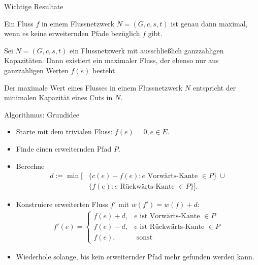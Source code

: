 \documentclass[aspectratio=169]{beamer}
\begin{document}
  \begin{frame}{Wichtige Resultate}

  \begin{theorem*}
    Ein Fluss $f$ in einem Flussnetzwerk $N = (G,c,s,t)$ ist genau dann maximal,
    wenn es keine erweiternden Pfade bezüglich $f$ gibt.
  \end{theorem*}

  \pause

  \begin{theorem*}
    Sei $N = (G,c,s,t)$ ein Flussnetzwerk mit ausschließlich ganzzahligen Kapazitäten.
    Dann existiert ein maximaler Fluss, der ebenso nur aus ganzzahligen Werten $f(e)$
    besteht.
  \end{theorem*}

  \pause

  \begin{theorem*}
    Der maximale Wert eines Flusses in einem Flussnetzwerk $N$ entspricht
    der minimalen Kapazität eines Cuts in $N$.
  \end{theorem*}

  \end{frame}

  \begin{frame}{Algorithmus: Grundidee}

  \begin{algorithmus*}
    \begin{itemize}
      \item<1-> Starte mit dem trivialen Fluss: $f(e) = 0 , e \in E$.
      \item<2-> Finde einen erweiternden Pfad $P$.
      \item<3-> Berechne
      \begin{align*}
        d := \min[&\{c(e) - f(e): e \text{ Vorwärts-Kante } \in P\} \ \cup \\
        &\{f(e): e \text{ Rückwärts-Kante } \in P\} ].
      \end{align*}
      \item<4-> Konstruiere erweiterten Fluss $f'$ mit $w(f') = w(f) + d$:
      \begin{align*}
        f'(e) = \begin{cases}
          f(e) + d, & e \text{ ist Vorwärts-Kante } \in P \\
          f(e) - d, & e \text{ ist Rückwärts-Kante } \in P\\
          f(e), & \text{ sonst}
        \end{cases}
      \end{align*}
      \item<5-> Wiederhole solange, bis kein erweiternder Pfad mehr gefunden werden kann.
    \end{itemize}
  \end{algorithmus*}

  \end{frame}
\end{document}
